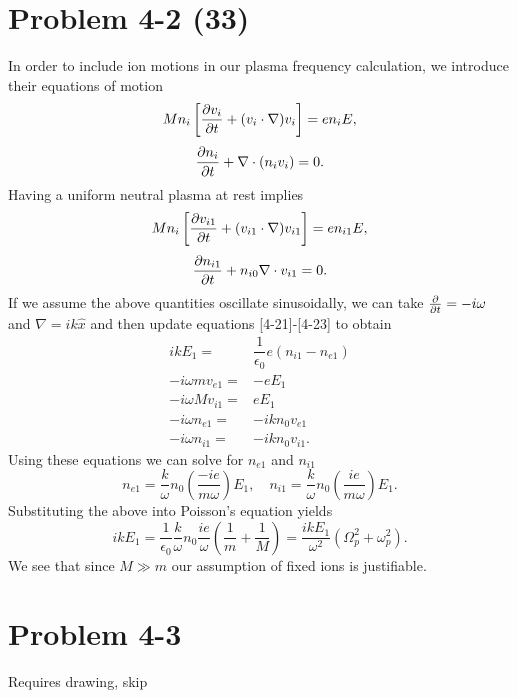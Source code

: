\section*{Problem 4-2 (33)}
\label{sec:4-2}
In order to include ion motions in our plasma frequency calculation, we introduce their equations of motion
\begin{equation*}
	Mn_i\left[\frac{\partial v_i}{\partial t} + (v_i \cdot \nabla)v_i \right] = en_iE,
\end{equation*}
\begin{equation*}
	\frac{\partial n_i}{\partial t} + \nabla \cdot (n_iv_i)  = 0.
\end{equation*}
Having a uniform neutral plasma at rest implies
\begin{equation*}
	Mn_i\left[\frac{\partial v_{i1}}{\partial t} + (v_{i1} \cdot \nabla)v_{i1} \right] = en_{i1}E,
\end{equation*}
\begin{equation*}
	\frac{\partial n_{i1}}{\partial t} + n_{i0}\nabla \cdot v_{i1}  = 0.
\end{equation*}
If we assume the above quantities oscillate sinusoidally, we can take \(\frac{\partial }{\partial t} = -i\omega\) and \(\nabla = ik\hat{x} \) and then update equations [4-21]-[4-23] to obtain
\begin{align*}
	ikE_1 =& \dfrac{1}{\epsilon_0}e(n_{i1} - n_{e1})\\
	-i\omega m v_{e1} =& -eE_1 \\
	-i\omega M v_{i1} =& eE_1 \\
	-i\omega n_{e1} =& -ikn_0 v_{e1}\\
	-i\omega n_{i1} =& -ikn_0 v_{i1}.
\end{align*}
Using these equations we can solve for \(n_{e1} \) and \(n_{i1}\)
\begin{equation*}
n_{e1} = \dfrac{k}{\omega}n_0\left(\dfrac{-ie}{m\omega} \right)E_1, \quad n_{i1} = \dfrac{k}{\omega}n_0\left(\dfrac{ie}{m\omega} \right)E_1.
\end{equation*}
Substituting the above into Poisson's equation yields
\begin{equation*}
	ikE_1 = \dfrac{1}{\epsilon_0}\dfrac{k}{\omega} n_0\dfrac{ie}{\omega}\left(\dfrac{1}{m} + \dfrac{1}{M}\right) = \dfrac{ikE_1}{\omega^2}\left(\Omega_p^2 + \omega_p^2 \right).
\end{equation*}
We see that since \(M \gg m\) our assumption of fixed ions is justifiable.

\section*{Problem 4-3}
\label{sec:4-3}
Requires drawing, skip


